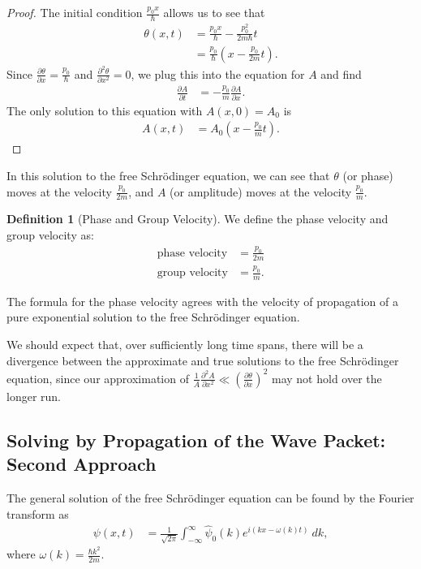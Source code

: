 \documentclass[12pt]{extarticle}
\theoremstyle{plain}
\theoremstyle{definition}
\newtheorem*{definition}{Definition}
\theoremstyle{remark}
\renewcommand{\newline}{\hfill\break}
\begin{document}
  \begin{proof}
    The initial condition $\frac{p_0x}{\hbar}$ allows us to see that
    \begin{align*}
      \theta(x,t) &= \frac{p_0x}{\hbar} - \frac{p_0^2}{2m\hbar}t\\
                  &= \frac{p_0}{\hbar}\left(x - \frac{p_0}{2m}t\right).
    \end{align*}
    Since $\frac{\partial \theta}{\partial x} = \frac{p_0}{\hbar}$ and $\frac{\partial ^2\theta}{\partial x^2} = 0$, we plug this into the equation for $A$ and find
    \begin{align*}
      \frac{\partial A}{\partial t} &= -\frac{p_0}{m}\frac{\partial A}{\partial x}.
    \end{align*}
    The only solution to this equation with $A(x,0) = A_0$ is
    \begin{align*}
      A(x,t) &= A_0\left(x - \frac{p_0}{m}t\right).
    \end{align*}
  \end{proof}
  In this solution to the free Schrödinger equation, we can see that $\theta$ (or phase) moves at the velocity $\frac{p_0}{2m}$, and $A$ (or amplitude) moves at the velocity $\frac{p_0}{m}$.
  \begin{definition}[Phase and Group Velocity]
    We define the phase velocity and group velocity as:
    \begin{align*}
      \text{phase velocity} &= \frac{p_0}{2m}\\
      \text{group velocity} &= \frac{p_0}{m}.
    \end{align*}
  \end{definition}
  The formula for the phase velocity agrees with the velocity of propagation of a pure exponential solution to the free Schrödinger equation.\newline

  We should expect that, over sufficiently long time spans, there will be a divergence between the approximate and true solutions to the free Schrödinger equation, since our approximation of $\frac{1}{A}\frac{\partial ^2A}{\partial x^2} \ll \left(\frac{\partial \theta}{\partial x}\right)^2$ may not hold over the longer run. 
  \subsection{Solving by Propagation of the Wave Packet: Second Approach}%
    The general solution of the free Schrödinger equation can be found by the Fourier transform as
    \begin{align*}
      \psi(x,t) &= \frac{1}{\sqrt{2\pi}}\int_{-\infty}^{\infty} \hat{\psi}_0(k)e^{i(kx-\omega(k)t)}\:dk,
    \end{align*}
    where $\omega(k)=\frac{\hbar k^2}{2m}$.\newline
\end{document}
